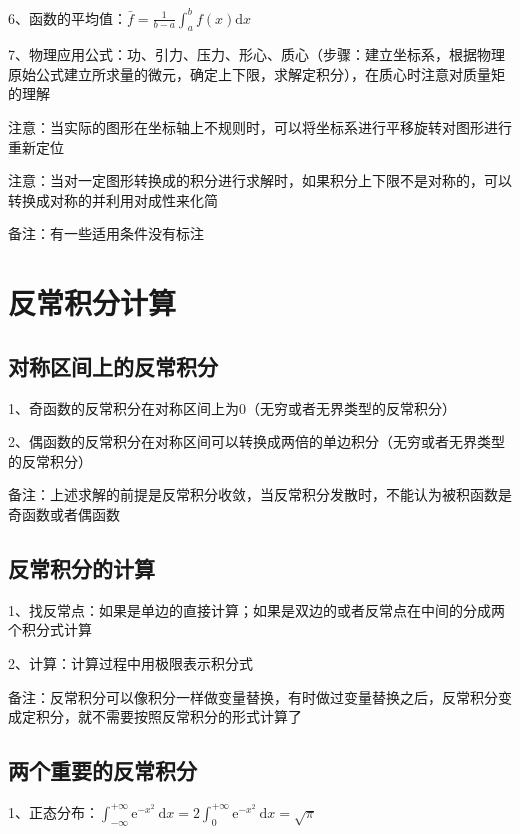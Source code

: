 6、函数的平均值：$\bar{f}=\frac{1}{b-a} \int_{a}^{b} f(x) \mathrm{d} x$

7、物理应用公式：功、引力、压力、形心、质心（步骤：建立坐标系，根据物理原始公式建立所求量的微元，确定上下限，求解定积分），在质心时注意对质量矩的理解

注意：当实际的图形在坐标轴上不规则时，可以将坐标系进行平移旋转对图形进行重新定位

注意：当对一定图形转换成的积分进行求解时，如果积分上下限不是对称的，可以转换成对称的并利用对成性来化简

备注：有一些适用条件没有标注

\section{反常积分计算}



\subsection{对称区间上的反常积分}

1、奇函数的反常积分在对称区间上为0（无穷或者无界类型的反常积分）

2、偶函数的反常积分在对称区间可以转换成两倍的单边积分（无穷或者无界类型的反常积分）

备注：上述求解的前提是反常积分收敛，当反常积分发散时，不能认为被积函数是奇函数或者偶函数



\subsection{反常积分的计算}

1、找反常点：如果是单边的直接计算；如果是双边的或者反常点在中间的分成两个积分式计算

2、计算：计算过程中用极限表示积分式

备注：反常积分可以像积分一样做变量替换，有时做过变量替换之后，反常积分变成定积分，就不需要按照反常积分的形式计算了



\subsection{两个重要的反常积分}

1、正态分布：$\int_{-\infty}^{+\infty} \mathrm{e}^{-x^{2}} \mathrm{~d} x=2 \int_{0}^{+\infty} \mathrm{e}^{-x^{2}} \mathrm{~d} x=\sqrt{\pi}$

